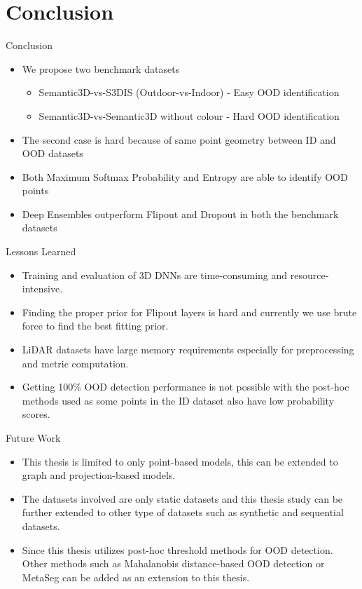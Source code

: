 \documentclass[aspectratio=169]{beamer}
\begin{document}
\section{Conclusion}
\begin{frame}{Conclusion}
    \begin{itemize}
        \item We propose two benchmark datasets 
        \begin{itemize}
            \item Semantic3D-vs-S3DIS (Outdoor-vs-Indoor) - Easy OOD identification
            \item Semantic3D-vs-Semantic3D without colour - Hard OOD identification
        \end{itemize}
        \item The second case is hard because of same point geometry between ID and OOD datasets
        \item Both Maximum Softmax Probability and Entropy are able to identify OOD points
        \item Deep Ensembles outperform Flipout and Dropout in both the benchmark datasets
    \end{itemize}
\end{frame}
\begin{frame}{Lessons Learned}
    \begin{itemize}
        \item Training and evaluation of 3D DNNs are time-consuming and resource-intensive.
        \item Finding the proper prior for Flipout layers is hard and currently we use brute force to find the best fitting prior.
        \item LiDAR datasets have large memory requirements especially for preprocessing and metric computation.
        \item Getting 100\% OOD detection performance is not possible with the post-hoc methods used as some points in the ID dataset also have low probability scores.
    \end{itemize}
\end{frame}
\begin{frame}{Future Work}
    \begin{itemize}
        \item This thesis is limited to only point-based models, this can be extended to graph and projection-based models.
        \item The datasets involved are only static datasets and this thesis study can be further extended to other type of datasets such as synthetic and sequential datasets.
        \item Since this thesis utilizes post-hoc threshold methods for OOD detection. Other methods such as Mahalanobis distance-based OOD detection \cite{lee2018simple_mahalanobis} or MetaSeg \cite{MetaSeg} can be added as an extension to this thesis.
    \end{itemize}
\end{frame}
\end{document}
